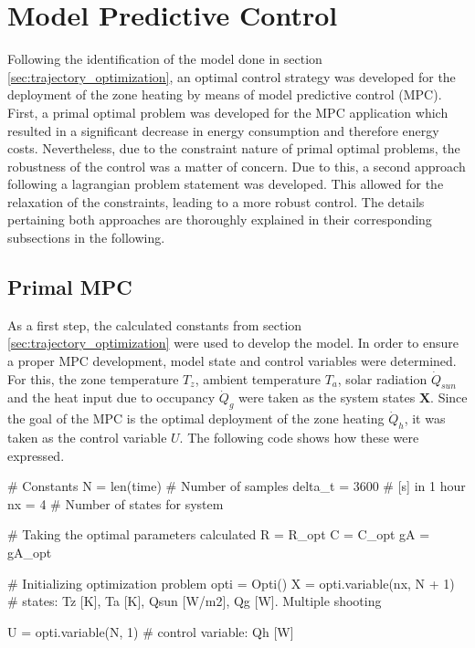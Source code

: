 \section{Model Predictive Control}
\label{sec:mpc}
Following the identification of the model done in section \ref{sec:trajectory_optimization}, an optimal control strategy was developed for the deployment of the zone heating by means of model predictive control (MPC). First, a primal optimal problem was developed for the MPC application which resulted in a significant decrease in energy consumption and therefore energy costs. Nevertheless, due to the constraint nature of primal optimal problems, the robustness of the control was a matter of concern. Due to this, a second approach following a lagrangian problem statement was developed. This allowed for the relaxation of the constraints, leading to a more robust control. The details pertaining both approaches are thoroughly explained in their corresponding subsections in the following.

\subsection{Primal MPC}
\label{subsec:primal_mpc}
As a first step, the calculated constants from section \ref{sec:trajectory_optimization} were used to develop the model. In order to ensure a proper MPC development, model state and control variables were determined. For this, the zone temperature $T_z$, ambient temperature $T_a$, solar radiation $\dot{Q}_{sun}$ and the heat input due to occupancy $\dot{Q}_g$ were taken as the system states $\boldsymbol{X}$. Since the goal of the MPC is the optimal deployment of the zone heating $\dot{Q}_{h}$, it was taken as the control variable $U$. The following code shows how these were expressed.

\begin{python}
    # Constants
    N = len(time)  # Number of samples
    delta_t = 3600  # [s] in 1 hour
    nx = 4  # Number of states for system
    
    # Taking the optimal parameters calculated
    R = R_opt
    C = C_opt
    gA = gA_opt

    # Initializing optimization problem
    opti = Opti()
    X = opti.variable(nx, N + 1)  # states: Tz [K], Ta [K], Qsun [W/m2], Qg [W]. Multiple shooting

    U = opti.variable(N, 1)  # control variable: Qh [W]
\end{python}


